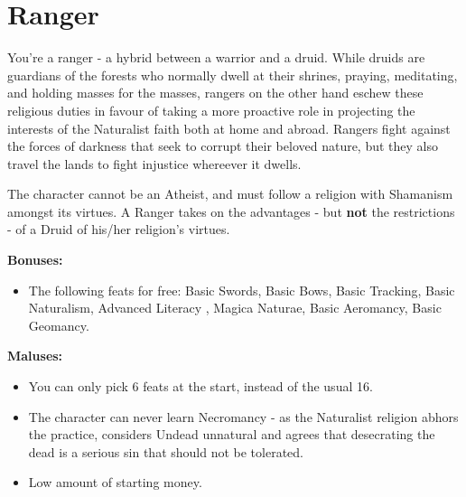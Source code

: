 \section{Ranger}
You're a ranger - a hybrid between a warrior and a druid. While druids are guardians of the forests who normally dwell at their shrines, praying, meditating, and holding masses for the masses, rangers on the other hand eschew these religious duties in favour of taking a more proactive role in projecting the interests of the Naturalist faith both at home and abroad. Rangers fight against the forces of darkness that seek to corrupt their beloved nature, but they also travel the lands to fight injustice whereever it dwells.

The character cannot be an Atheist, and must follow a religion with Shamanism amongst its virtues. A Ranger takes on the advantages - but \textbf{not} the restrictions - of a Druid of his/her religion's virtues.

\textbf{Bonuses:}
\begin{itemize}
	\item The following feats for free: Basic Swords, Basic Bows, Basic Tracking, Basic Naturalism, Advanced Literacy , Magica Naturae, Basic Aeromancy, Basic Geomancy.
\end{itemize}


\textbf{Maluses:}
\begin{itemize}
	\item You can only pick 6 feats at the start, instead of the usual 16.
	\item The character can never learn Necromancy - as the Naturalist religion abhors the practice, considers Undead unnatural and agrees that desecrating the dead is a serious sin that should not be tolerated.
	\item Low amount of starting money.
\end{itemize}
